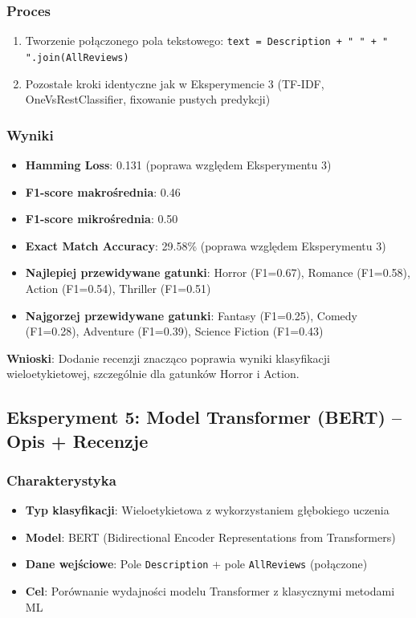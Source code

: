 \documentclass[12pt,a4paper]{article}
\begin{document}
\subsubsection{Proces}
\begin{enumerate}
    \item Tworzenie połączonego pola tekstowego: \texttt{text = Description + " " + " ".join(AllReviews)}
    \item Pozostałe kroki identyczne jak w Eksperymencie 3 (TF-IDF, OneVsRestClassifier, fixowanie pustych predykcji)
\end{enumerate}

\subsubsection{Wyniki}
\begin{itemize}
    \item \textbf{Hamming Loss}: 0.131 (poprawa względem Eksperymentu 3)
    \item \textbf{F1-score makrośrednia}: 0.46
    \item \textbf{F1-score mikrośrednia}: 0.50
    \item \textbf{Exact Match Accuracy}: 29.58\% (poprawa względem Eksperymentu 3)
    \item \textbf{Najlepiej przewidywane gatunki}: Horror (F1=0.67), Romance (F1=0.58), Action (F1=0.54), Thriller (F1=0.51)
    \item \textbf{Najgorzej przewidywane gatunki}: Fantasy (F1=0.25), Comedy (F1=0.28), Adventure (F1=0.39), Science Fiction (F1=0.43)
\end{itemize}

\textbf{Wnioski}: Dodanie recenzji znacząco poprawia wyniki klasyfikacji wieloetykietowej, szczególnie dla gatunków Horror i Action.

\subsection{Eksperyment 5: Model Transformer (BERT) -- Opis + Recenzje}

\subsubsection{Charakterystyka}
\begin{itemize}
    \item \textbf{Typ klasyfikacji}: Wieloetykietowa z wykorzystaniem głębokiego uczenia
    \item \textbf{Model}: BERT (Bidirectional Encoder Representations from Transformers)
    \item \textbf{Dane wejściowe}: Pole \texttt{Description} + pole \texttt{AllReviews} (połączone)
    \item \textbf{Cel}: Porównanie wydajności modelu Transformer z klasycznymi metodami ML
\end{itemize}
\end{document}
